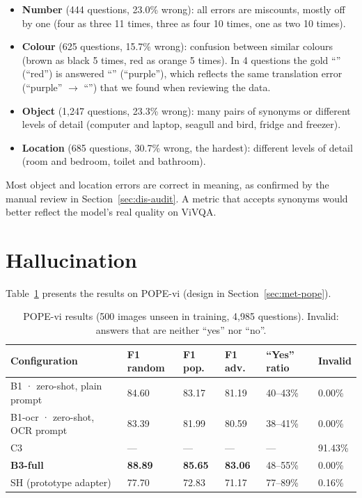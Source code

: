 \begin{itemize}
  \item \textbf{Number} (444 questions, 23.0\% wrong): all errors are miscounts, mostly off by
  one (four as three 11 times, three as four 10 times, one as two 10 times).
  \item \textbf{Colour} (625 questions, 15.7\% wrong): confusion between similar colours
  (brown as black 5 times, red as orange 5 times). In 4 questions the gold ``''
  (``red'') is answered ``'' (``purple''), which reflects the same translation
  error (``purple'' $\to$ ``'') that we found when reviewing the data.
  \item \textbf{Object} (1,247 questions, 23.3\% wrong): many pairs of synonyms or different
  levels of detail (computer and laptop, seagull and bird, fridge and freezer).
  \item \textbf{Location} (685 questions, 30.7\% wrong, the hardest): different levels of
  detail (room and bedroom, toilet and bathroom).
\end{itemize}

Most object and location errors are correct in meaning, as confirmed by the manual review in
Section~\ref{sec:dis-audit}. A metric that accepts synonyms would better reflect the model's
real quality on ViVQA.

\section{Hallucination}
\label{sec:dis-halluc}

Table~\ref{tab:dis-pope} presents the results on POPE-vi (design in
Section~\ref{sec:met-pope}).

\begin{table}[htbp]
\caption{POPE-vi results (500 images unseen in training, 4,985 questions). Invalid: answers that are neither ``yes'' nor ``no''.}
\label{tab:dis-pope}
\centering
\small
\begin{tabular}{p{}p{}p{}p{}p{}p{}}
\toprule
\textbf{Configuration} & \textbf{F1 random} & \textbf{F1 pop.} & \textbf{F1 adv.} & \textbf{``Yes'' ratio} & \textbf{Invalid} \\
\midrule
B1 · zero-shot, plain prompt & 84.60 & 83.17 & 81.19 & 40--43\% & 0.00\% \\
B1-ocr · zero-shot, OCR prompt & 83.39 & 81.99 & 80.59 & 38--41\% & 0.00\% \\
C3 & --- & --- & --- & --- & 91.43\% \\
\textbf{B3-full} & \textbf{88.89} & \textbf{85.65} & \textbf{83.06} & 48--55\% & 0.00\% \\
SH (prototype adapter) & 77.70 & 72.83 & 71.17 & 77--89\% & 0.16\% \\
\bottomrule
\end{tabular}
\end{table}

